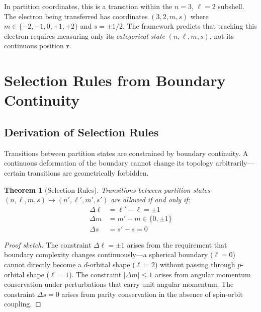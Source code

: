 \documentclass[twocolumn,aps,prx,superscriptaddress,longbibliography]{revtex4-2}
\newtheorem{theorem}{Theorem}[section]
\theoremstyle{remark}
\begin{document}
In partition coordinates, this is a transition within the $n=3$, $\ell=2$
subshell. The electron being transferred has coordinates $(3, 2, m, s)$
where $m \in \{-2, -1, 0, +1, +2\}$ and $s = \pm 1/2$. The framework
predicts that tracking this electron requires measuring only its
\textit{categorical state} $(n, \ell, m, s)$, not its continuous position
$\mathbf{r}$.

\section{Selection Rules from Boundary Continuity}
\label{sec:selection}

\subsection{Derivation of Selection Rules}

Transitions between partition states are constrained by boundary continuity.
A continuous deformation of the boundary cannot change its topology
arbitrarily---certain transitions are geometrically forbidden.

\begin{theorem}[Selection Rules]
\label{thm:selection}
Transitions between partition states $(n, \ell, m, s) \to (n', \ell', m', s')$
are allowed if and only if:
\begin{align}
\Delta \ell &= \ell' - \ell = \pm 1 \label{eq:sel_l} \\
\Delta m &= m' - m \in \{0, \pm 1\} \label{eq:sel_m} \\
\Delta s &= s' - s = 0 \label{eq:sel_s}
\end{align}
\end{theorem}

\begin{proof}[Proof sketch]
The constraint $\Delta \ell = \pm 1$ arises from the requirement that
boundary complexity changes continuously---a spherical boundary ($\ell=0$)
cannot directly become a $d$-orbital shape ($\ell=2$) without passing
through $p$-orbital shape ($\ell=1$). The constraint $|\Delta m| \leq 1$
arises from angular momentum conservation under perturbations that carry
unit angular momentum. The constraint $\Delta s = 0$ arises from parity
conservation in the absence of spin-orbit coupling.
\end{proof}
\end{document}
